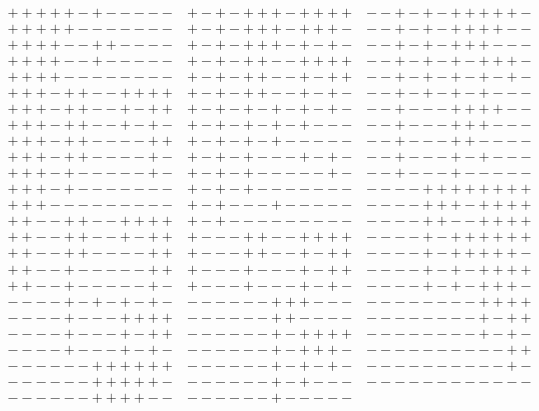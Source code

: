 \documentclass[12pt]{article}
\theoremstyle{definition}
\theoremstyle{plain}
\begin{document}
\[\begin{array}{lcr}
    + + + + + - + - - - - - & + - + - + + + - + + + + & - - + - + - + + + + + - \\
    + + + + + - - - - - - - & + - + - + + + - + + + - & - - + - + - + + + + - - \\
    + + + + - - + + - - - - & + - + - + + + - + - + - & - - + - + - + + + - - - \\
    + + + + - - + - - - - - & + - + - + + - - + + + + & - - + - + - + - + + + - \\
    + + + + - - - - - - - - & + - + - + + - - + - + + & - - + - + - + - + - + - \\
    + + + - + + - - + + + + & + - + - + + - - + - + - & - - + - + - + - + - - - \\
    + + + - + + - - + - + + & + - + - + - + - + - + - & - - + - - - + + + + - - \\
    + + + - + + - - + - + - & + - + - + - + - + - - - & - - + - - - + + + - - - \\
    + + + - + + - - - - + + & + - + - + - + - - - - - & - - + - - - + + - - - - \\
    + + + - + + - - - - + - & + - + - + - - - + - + - & - - + - - - + - + - - - \\
    + + + - + - - - - - + - & + - + - + - - - - - + - & - - + - - - + - - - - - \\
    + + + - + - - - - - - - & + - + - + - - - - - - - & - - - - + + + + + + + + \\
    + + + - - - - - - - - - & + - + - - - + - - - - - & - - - - + + + - + + + + \\
    + + - - + + - - + + + + & + - + - - - - - - - - - & - - - - + + - - + + + + 
\end{array}
\]
\[
\begin{array}{lcr}
    + + - - + + - - + - + + & + - - - + + - - + + + + & - - - - + - + + + + + + \\
    + + - - + + - - - - + + & + - - - + + - - + - + + & - - - - + - + + + + + - \\
    + + - - + - - - - - + + & + - - - + - - - + - + + & - - - - + - + - + + + + \\
    + + - - + - - - - - + - & + - - - + - - - + - + - & - - - - + - + - + + + - \\
    - - - - + - + - + - + - & - - - - - - + + + - - - & - - - - - - - - + + + + \\
    - - - - + - - - + + + + & - - - - - - + + - - - - & - - - - - - - - + - + + \\
    - - - - + - - - + - + + & - - - - - - + - + + + + & - - - - - - - - + - + - \\
    - - - - + - - - + - + - & - - - - - - + - + + + - & - - - - - - - - - - + + \\
    - - - - - - + + + + + + & - - - - - - + - + - + - & - - - - - - - - - - + - \\
    - - - - - - + + + + + - & - - - - - - + - + - - - & - - - - - - - - - - - - \\
    - - - - - - + + + + - - & - - - - - - + - - - - - & 
\end{array}
\]
\end{document}

